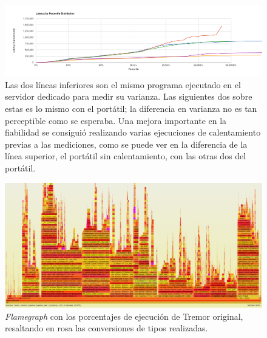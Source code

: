 \begin{figure}
    \centering
    \includegraphics[width=\textwidth]{./Imagenes/histogram_variance.png}
    \caption{Las dos líneas inferiores son el mismo programa ejecutado en el
    servidor dedicado para medir su varianza. Las siguientes dos sobre estas es
    lo mismo con el portátil; la diferencia en varianza no es tan perceptible
    como se esperaba. Una mejora importante en la fiabilidad se consiguió
    realizando varias ejecuciones de calentamiento previas a las mediciones,
    como se puede ver en la diferencia de la línea superior, el portátil sin
    calentamiento, con las otras dos del portátil.}%
    \label{fig:histogram_variance}
\end{figure}

\begin{figure}
    \centering
    \includegraphics[width=\textwidth]{./Imagenes/without_value_conv.png}
    \caption{\emph{Flamegraph} con los porcentajes de ejecución de Tremor
    original, resaltando en rosa las conversiones de tipos realizadas.}%
    \label{fig:without_value_conv}
\end{figure}

